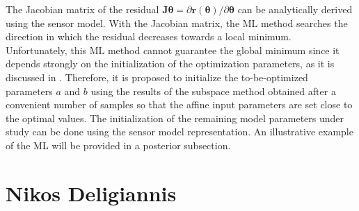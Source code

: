 \documentclass[11pt]{article}
\begin{document}
\begin{itemize}
    The Jacobian matrix of the residual $\mathbf{J}\bm{\theta} = \partial \mathbf{r}(\bm{\theta}) / \partial \bm{\theta}$ can be analytically derived using the sensor model.
    With the Jacobian matrix, the ML method searches the direction in which the residual decreases towards a local minimum.
    Unfortunately, this ML method cannot guarantee the global minimum since it depends strongly on the initialization of the optimization parameters, as it is discussed in \cite{Nocedal06}.
    Therefore, it is proposed to initialize the to-be-optimized parameters $a$ and $b$ using the results of the subspace method obtained after a convenient number of samples so that the affine input parameters are set close to the optimal values.
    The initialization of the remaining model parameters under study can be done using the sensor model representation.
    An illustrative example of the ML will be provided in a posterior subsection.  
    \color{black}
\end{itemize}

\section*{Nikos Deligiannis}
\end{document}
